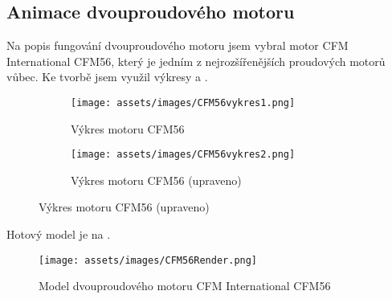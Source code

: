 \subsection{Animace dvouproudového motoru}
{Na popis fungování dvouproudového motoru jsem vybral motor CFM International CFM56, který je jedním z nejrozšířenějších proudových motorů vůbec. Ke tvorbě jsem využil výkresy  a .}
\cite{RG:ReducedOrderModel}\cite{TL:OffDesignPerformancePrediction}
\begin{figure}[H]
    \centering
    \begingroup
    \makeatletter
    \renewcommand\thesubfigure{\thefigure~--~\@nameuse{subfiglabel@\alph{subfigure}}}
    \newcommand{\subfiglabel@a}{vlevo}
    \newcommand{\subfiglabel@b}{vpravo}
    \captionsetup[subfigure]{labelformat=simple, labelsep=colon}
    \renewcommand\p@subfigure{}
    \makeatother
    \begin{subfigure}{.5\textwidth}
        \centering
        \texttt{[image: assets/images/CFM56vykres1.png]}
        \caption{Výkres motoru CFM56}
        \label{obr:CFM56vykres1}
    \end{subfigure}%
    \begin{subfigure}{.5\textwidth}
        \centering
        \texttt{[image: assets/images/CFM56vykres2.png]}
        \caption{Výkres motoru CFM56 (upraveno)}
        \label{obr:CFM56vykres2}
    \end{subfigure}
    \endgroup
\end{figure}
{Hotový model je na .}
\begin{figure}[H]
    \centering
    \texttt{[image: assets/images/CFM56Render.png]}
    \caption{Model dvouproudového motoru CFM International CFM56 \jaObr}
    \label{obr:CFM56Render}
\end{figure}
